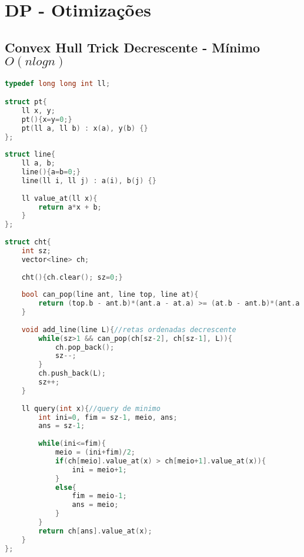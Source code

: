 \documentclass[12pt,a4paper,twoside]{report}
\begin{document}
\lstlistoflistings

\tableofcontents    


\fancyhead[RE,LO]{\thesection}

\setlength{\parskip}{0.15in} %

\chapter{DP - Otimizações}

\section{Convex Hull Trick Decrescente - Mínimo $O(n log n)$}
\noindent\begin{lstlisting}[caption=Convex Hull Trick Decrescente - Mínimo (n log n),language=C++]
typedef long long int ll;

struct pt{
    ll x, y;
    pt(){x=y=0;}
    pt(ll a, ll b) : x(a), y(b) {}
};
 
struct line{
    ll a, b;
    line(){a=b=0;}
    line(ll i, ll j) : a(i), b(j) {}
     
    ll value_at(ll x){
        return a*x + b;
    }
};
  
struct cht{     
    int sz;
    vector<line> ch;
     
    cht(){ch.clear(); sz=0;}
     
    bool can_pop(line ant, line top, line at){
        return (top.b - ant.b)*(ant.a - at.a) >= (at.b - ant.b)*(ant.a - top.a);
    }
     
    void add_line(line L){//retas ordenadas decrescente
        while(sz>1 && can_pop(ch[sz-2], ch[sz-1], L)){
            ch.pop_back();
            sz--;
        }
        ch.push_back(L);
        sz++;
    }
     
    ll query(int x){//query de minimo         
        int ini=0, fim = sz-1, meio, ans;
        ans = sz-1;
         
        while(ini<=fim){
            meio = (ini+fim)/2;             
            if(ch[meio].value_at(x) > ch[meio+1].value_at(x)){
                ini = meio+1;
            }
            else{
                fim = meio-1;
                ans = meio;
            }
        }
        return ch[ans].value_at(x);
    }     
};
\end{lstlisting}
\end{document}
